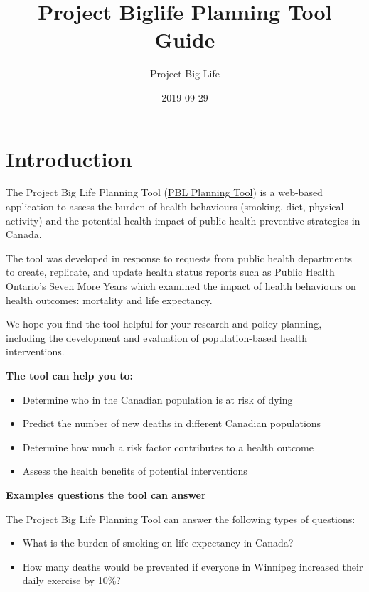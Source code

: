 \documentclass[]{book}
\title{Project Biglife Planning Tool Guide}
\author{Project Big Life}
\date{2019-09-29}
\providecommand{\tightlist}{%
  \setlength{\itemsep}{0pt}\setlength{\parskip}{0pt}}
\begin{document}
\maketitle

{
\setcounter{tocdepth}{1}
\tableofcontents
}
\hypertarget{introduction}{%
\chapter{Introduction}\label{introduction}}

The Project Big Life Planning Tool (\href{http://planning.projectbiglife.ca/}{PBL Planning Tool}) is a web-based application to assess the burden of health behaviours (smoking, diet, physical activity) and the potential health impact of public health preventive strategies in Canada.

The tool was developed in response to requests from public health departments to create, replicate, and update health status reports such as Public Health Ontario's \href{https://www.ices.on.ca/Publications/Atlases-and-Reports/2012/Seven-More-Years}{Seven More Years} which examined the impact of health behaviours on health outcomes: mortality and life expectancy.

We hope you find the tool helpful for your research and policy planning, including the development and evaluation of population-based health interventions.

\textbf{The tool can help you to:}

\begin{itemize}
\tightlist
\item
  Determine who in the Canadian population is at risk of dying
\item
  Predict the number of new deaths in different Canadian populations
\item
  Determine how much a risk factor contributes to a health outcome
\item
  Assess the health benefits of potential interventions
\end{itemize}

\textbf{Examples questions the tool can answer}

The Project Big Life Planning Tool can answer the following types of questions:

\begin{itemize}
\tightlist
\item
  What is the burden of smoking on life expectancy in Canada?
\item
  How many deaths would be prevented if everyone in Winnipeg increased their daily exercise by 10\%?
\end{itemize}
\end{document}
